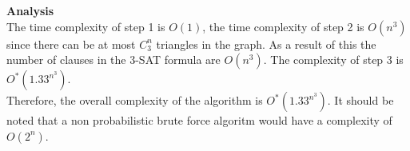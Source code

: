 \documentclass[12pt]{article}
\begin{document}
\begin{enumerate}
\begin{enumerate}
\textbf{Analysis}\\
The time complexity of step 1 is $O(1)$, the time complexity of step 2 is $O(n^3)$ since there can be at most $C^n_3$ triangles in the graph. As a result of this the number of clauses in the 3-SAT formula are $O(n^3)$. The complexity of step 3 is $O^*(1.33^{n^3})$.\\
Therefore, the overall complexity of the algorithm is $O^*(1.33^{n^3})$. It should be noted that a non probabilistic brute force algoritm would have a complexity of $O(2^n)$.
\end{enumerate}
\end{enumerate}
\end{document}
